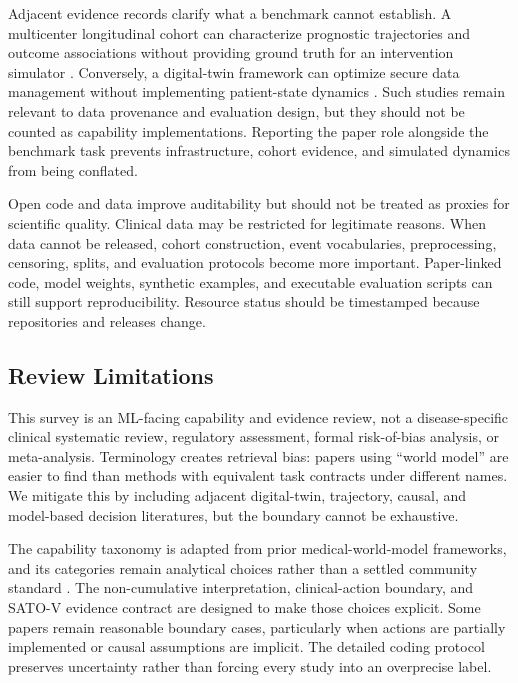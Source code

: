 Adjacent evidence records clarify what a benchmark cannot establish. A multicenter longitudinal cohort can characterize prognostic trajectories and outcome associations without providing ground truth for an intervention simulator \citep{Li2021TrajectoriesPerioperativeSerum}. Conversely, a digital-twin framework can optimize secure data management without implementing patient-state dynamics \citep{Alotaibi2026CostOptimizedTwin}. Such studies remain relevant to data provenance and evaluation design, but they should not be counted as capability implementations. Reporting the paper role alongside the benchmark task prevents infrastructure, cohort evidence, and simulated dynamics from being conflated.

Open code and data improve auditability but should not be treated as proxies for scientific quality. Clinical data may be restricted for legitimate reasons. When data cannot be released, cohort construction, event vocabularies, preprocessing, censoring, splits, and evaluation protocols become more important. Paper-linked code, model weights, synthetic examples, and executable evaluation scripts can still support reproducibility. Resource status should be timestamped because repositories and releases change.

\subsection{Review Limitations}

This survey is an ML-facing capability and evidence review, not a disease-specific clinical systematic review, regulatory assessment, formal risk-of-bias analysis, or meta-analysis. Terminology creates retrieval bias: papers using ``world model'' are easier to find than methods with equivalent task contracts under different names. We mitigate this by including adjacent digital-twin, trajectory, causal, and model-based decision literatures, but the boundary cannot be exhaustive.

The capability taxonomy is adapted from prior medical-world-model frameworks, and its categories remain analytical choices rather than a settled community standard \citep{Qazi2025BeyondGenerativeAI,Saeed2026MedicalWorldModel,Liu2026MedicalWorldModelsReview,Wang2026TowardsBiomedicalWorldModels}. The non-cumulative interpretation, clinical-action boundary, and SATO-V evidence contract are designed to make those choices explicit. Some papers remain reasonable boundary cases, particularly when actions are partially implemented or causal assumptions are implicit. The detailed coding protocol preserves uncertainty rather than forcing every study into an overprecise label.

